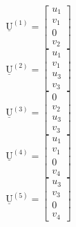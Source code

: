 \documentclass[12pt,a4paper]{article}
\def\vec#1{\underline{\mathrm{#1}}}
\begin{document}
\begin{multicols}{7}
    \noindent
    \begin{equation*}
        \vec{U}^{\left(1\right)}=
        \begin{bmatrix}
            u_1 \\
            v_1 \\
            0   \\
            v_2
        \end{bmatrix}
    \end{equation*}
    \columnbreak
    \begin{equation*}
        \vec{U}^{\left(2\right)}=
        \begin{bmatrix}
            u_1 \\
            v_1 \\
            u_3 \\
            v_3
        \end{bmatrix}
    \end{equation*}
    \columnbreak
    \begin{equation*}
        \vec{U}^{\left(3\right)}=
        \begin{bmatrix}
            0   \\
            v_2 \\
            u_3 \\
            v_3
        \end{bmatrix}
    \end{equation*}
    \columnbreak
    \begin{equation*}
        \vec{U}^{\left(4\right)}=
        \begin{bmatrix}
            u_1 \\
            v_1 \\
            0   \\
            v_4
        \end{bmatrix}
    \end{equation*}
    \begin{equation*}
        \vec{U}^{\left(5\right)}=
        \begin{bmatrix}
            u_3 \\
            v_3 \\
            0   \\
            v_4
        \end{bmatrix}
    \end{equation*}

\end{multicols}
\end{document}
